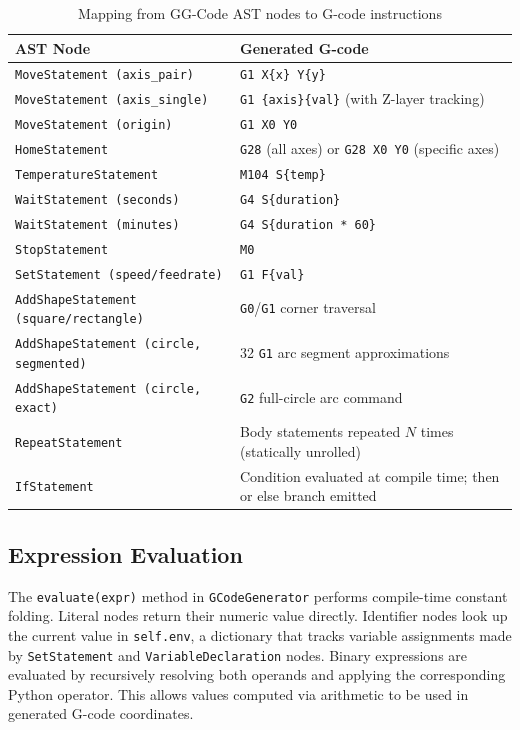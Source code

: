 \begin{table}[H]
\centering
\begin{tabular}{|l|p{7.5cm}|}
\hline
\textbf{AST Node} & \textbf{Generated G-code} \\
\hline
\texttt{MoveStatement (axis\_pair)} & \texttt{G1 X\{x\} Y\{y\}} \\
\hline
\texttt{MoveStatement (axis\_single)} & \texttt{G1 \{axis\}\{val\}} (with Z-layer tracking) \\
\hline
\texttt{MoveStatement (origin)} & \texttt{G1 X0 Y0} \\
\hline
\texttt{HomeStatement} & \texttt{G28} (all axes) or \texttt{G28 X0 Y0} (specific axes) \\
\hline
\texttt{TemperatureStatement} & \texttt{M104 S\{temp\}} \\
\hline
\texttt{WaitStatement (seconds)} & \texttt{G4 S\{duration\}} \\
\hline
\texttt{WaitStatement (minutes)} & \texttt{G4 S\{duration * 60\}} \\
\hline
\texttt{StopStatement} & \texttt{M0} \\
\hline
\texttt{SetStatement (speed/feedrate)} & \texttt{G1 F\{val\}} \\
\hline
\texttt{AddShapeStatement (square/rectangle)} & \texttt{G0}/\texttt{G1} corner traversal \\
\hline
\texttt{AddShapeStatement (circle, segmented)} & 32 \texttt{G1} arc segment approximations \\
\hline
\texttt{AddShapeStatement (circle, exact)} & \texttt{G2} full-circle arc command \\
\hline
\texttt{RepeatStatement} & Body statements repeated $N$ times (statically unrolled) \\
\hline
\texttt{IfStatement} & Condition evaluated at compile time; then or else branch emitted \\
\hline
\end{tabular}
\caption{Mapping from GG-Code AST nodes to G-code instructions}
\label{tab:gcode_mapping}
\end{table}

\subsection*{Expression Evaluation}

The \texttt{evaluate(expr)} method in \texttt{GCodeGenerator} performs compile-time constant folding. Literal nodes return their numeric value directly. Identifier nodes look up the current value in \texttt{self.env}, a dictionary that tracks variable assignments made by \texttt{SetStatement} and \texttt{VariableDeclaration} nodes. Binary expressions are evaluated by recursively resolving both operands and applying the corresponding Python operator. This allows values computed via arithmetic to be used in generated G-code coordinates.

